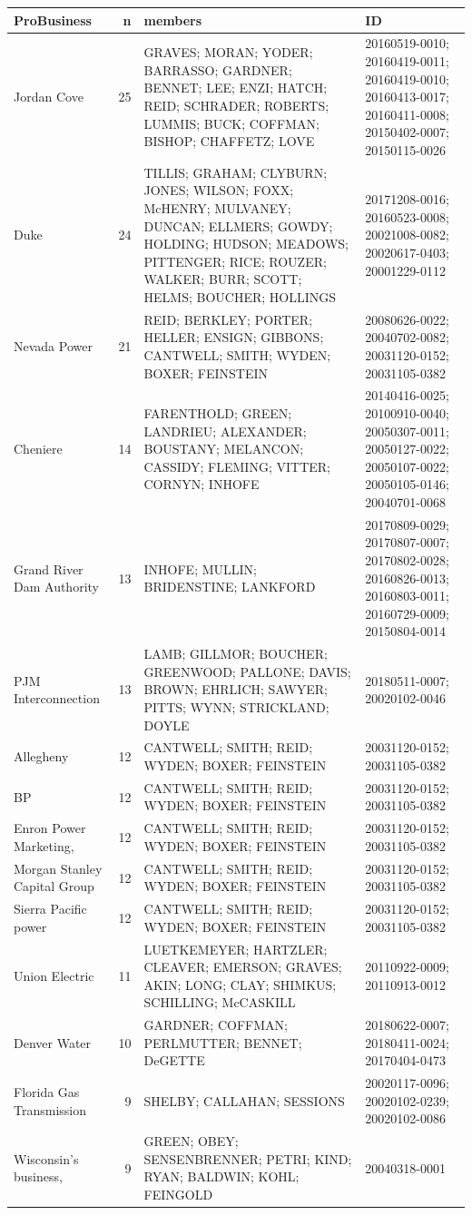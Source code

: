 \documentclass[]{article}
\begin{document}
\begin{longtable}[]{@{}lrll@{}}
\toprule
ProBusiness & n & members & ID\tabularnewline
\midrule
\endhead
Jordan Cove & 25 & GRAVES; MORAN; YODER; BARRASSO; GARDNER; BENNET; LEE;
ENZI; HATCH; REID; SCHRADER; ROBERTS; LUMMIS; BUCK; COFFMAN; BISHOP;
CHAFFETZ; LOVE & 20160519-0010; 20160419-0011; 20160419-0010;
20160413-0017; 20160411-0008; 20150402-0007;
20150115-0026\tabularnewline
Duke & 24 & TILLIS; GRAHAM; CLYBURN; JONES; WILSON; FOXX; McHENRY;
MULVANEY; DUNCAN; ELLMERS; GOWDY; HOLDING; HUDSON; MEADOWS; PITTENGER;
RICE; ROUZER; WALKER; BURR; SCOTT; HELMS; BOUCHER; HOLLINGS &
20171208-0016; 20160523-0008; 20021008-0082; 20020617-0403;
20001229-0112\tabularnewline
Nevada Power & 21 & REID; BERKLEY; PORTER; HELLER; ENSIGN; GIBBONS;
CANTWELL; SMITH; WYDEN; BOXER; FEINSTEIN & 20080626-0022; 20040702-0082;
20031120-0152; 20031105-0382\tabularnewline
Cheniere & 14 & FARENTHOLD; GREEN; LANDRIEU; ALEXANDER; BOUSTANY;
MELANCON; CASSIDY; FLEMING; VITTER; CORNYN; INHOFE & 20140416-0025;
20100910-0040; 20050307-0011; 20050127-0022; 20050107-0022;
20050105-0146; 20040701-0068\tabularnewline
Grand River Dam Authority & 13 & INHOFE; MULLIN; BRIDENSTINE; LANKFORD &
20170809-0029; 20170807-0007; 20170802-0028; 20160826-0013;
20160803-0011; 20160729-0009; 20150804-0014\tabularnewline
PJM Interconnection & 13 & LAMB; GILLMOR; BOUCHER; GREENWOOD; PALLONE;
DAVIS; BROWN; EHRLICH; SAWYER; PITTS; WYNN; STRICKLAND; DOYLE &
20180511-0007; 20020102-0046\tabularnewline
Allegheny & 12 & CANTWELL; SMITH; REID; WYDEN; BOXER; FEINSTEIN &
20031120-0152; 20031105-0382\tabularnewline
BP & 12 & CANTWELL; SMITH; REID; WYDEN; BOXER; FEINSTEIN &
20031120-0152; 20031105-0382\tabularnewline
Enron Power Marketing, & 12 & CANTWELL; SMITH; REID; WYDEN; BOXER;
FEINSTEIN & 20031120-0152; 20031105-0382\tabularnewline
Morgan Stanley Capital Group & 12 & CANTWELL; SMITH; REID; WYDEN; BOXER;
FEINSTEIN & 20031120-0152; 20031105-0382\tabularnewline
Sierra Pacific power & 12 & CANTWELL; SMITH; REID; WYDEN; BOXER;
FEINSTEIN & 20031120-0152; 20031105-0382\tabularnewline
Union Electric & 11 & LUETKEMEYER; HARTZLER; CLEAVER; EMERSON; GRAVES;
AKIN; LONG; CLAY; SHIMKUS; SCHILLING; McCASKILL & 20110922-0009;
20110913-0012\tabularnewline
Denver Water & 10 & GARDNER; COFFMAN; PERLMUTTER; BENNET; DeGETTE &
20180622-0007; 20180411-0024; 20170404-0473\tabularnewline
Florida Gas Transmission & 9 & SHELBY; CALLAHAN; SESSIONS &
20020117-0096; 20020102-0239; 20020102-0086\tabularnewline
Wisconsin's business, & 9 & GREEN; OBEY; SENSENBRENNER; PETRI; KIND;
RYAN; BALDWIN; KOHL; FEINGOLD & 20040318-0001\tabularnewline

\end{longtable}
\end{document}
